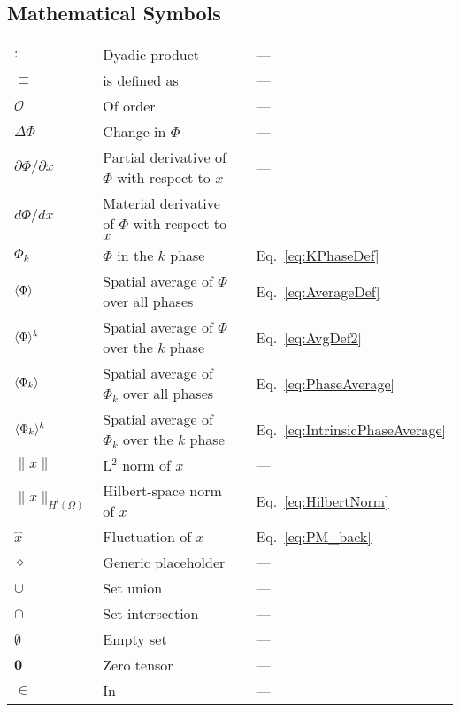 \subsection*{Mathematical Symbols}
\begin{tabular}{p{2cm}p{9cm}p{2cm}p{5cm}}
\(\colon\) & Dyadic product &  \hspace{0.1cm}& ---\\
\(\equiv\) & is defined as &  & ---\\
\(\mathcal{O}\) & Of order &  & ---\\
\(\Delta\Phi\) & Change in $\Phi$ & & ---\\
\(\partial \Phi/\partial x\) & Partial derivative of \(\Phi\) with respect to \(x\) &  & ---\\
\(d\Phi/dx\) & Material derivative of \(\Phi\) with respect to \(x\) &  & ---\\
\(\Phi_k\) & \(\Phi\) in the \(k\) phase &  & Eq.\ \eqref{eq:KPhaseDef}\\
\(\langle \Phi\rangle\) & Spatial average of \(\Phi\) over all phases &  & Eq.\ \eqref{eq:AverageDef}\\
\(\langle \Phi\rangle^k\) & Spatial average of \(\Phi\) over the \(k\) phase &  & Eq.\ \eqref{eq:AvgDef2}\\
\(\langle\Phi_k\rangle\) & Spatial average of \(\Phi_k\) over all phases & & Eq.\ \eqref{eq:PhaseAverage}\\
\(\langle\Phi_k\rangle^k\) & Spatial average of \(\Phi_k\) over the \(k\) phase & & Eq.\ \eqref{eq:IntrinsicPhaseAverage}\\
\(\|x\|\) & L$^2$ norm of \(x\) & & ---\\
\(\|x\|_{H^l(\Omega)}\) & Hilbert-space norm of \(x\) & & Eq.\ \eqref{eq:HilbertNorm}\\
\(\hat{x}\) & Fluctuation of \(x\) & & Eq.\ \eqref{eq:PM_back}\\
\(\diamond\) & Generic placeholder & & ---\\
\(\cup\) & Set union & & ---\\
\(\cap\) & Set intersection & &--- \\
\(\emptyset\) & Empty set & & ---\\
\(\textbf{0}\) & Zero tensor & & ---\\
\(\in\) & In & & ---\\
\end{tabular}

